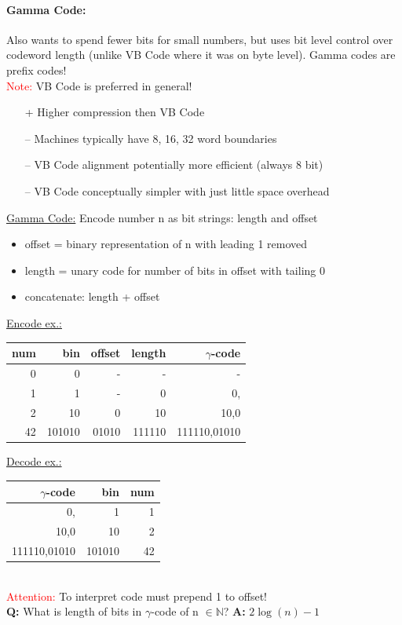 \documentclass[a4paper,11pt]{article}
\newcommand{\N}{\mathbb{N}}
\begin{document}
\begin{multicols}{2}
\paragraph{Gamma Code:} Also wants to spend fewer bits for small numbers, but uses bit level control over codeword length (unlike VB Code where it was on byte level). Gamma codes are prefix codes!\\
\textcolor{red}{Note:} VB Code is preferred in general!
\begin{itemize}
  \item[+] Higher compression then VB Code
  \item[--] Machines typically have 8, 16, 32 word boundaries
  \item[--] VB Code alignment potentially more efficient (always 8 bit)
  \item[--] VB Code conceptually simpler with just little space overhead
\end{itemize}
\vspace{0.2cm}
\begin{addmargin}[0.28cm]{0cm} %
  \underline{Gamma Code:} Encode number n as bit strings: length and offset
  \begin{itemize}
    \item offset = binary representation of n with leading 1 removed
    \item length = unary code for number of bits in offset with tailing 0
    \item concatenate: length + offset
  \end{itemize}
  \underline{Encode ex.:}\\
  \vspace{-0.3cm}
  \begin{flushright}
    \begin{tabular}{r|r|r|r|r}
      num & bin & offset & length & $\gamma$-code \\
      \hline
      0 & 0 & - & - & - \\
      1 & 1 & - & 0 & 0, \\
      2 & 10 & 0 & 10 & 10,0\\
      42 & 101010 & 01010 & 111110 & 111110,01010\\
    \end{tabular}
  \end{flushright}
  \underline{Decode ex.:}\\
  \vspace{-0.3cm}
  \hspace{2cm}
    \begin{tabular}{r|r|r}
      $\gamma$-code & bin & num\\
      \hline
      0, & 1 & 1 \\
      10,0 & 10 & 2\\
      111110,01010 & 101010 & 42
    \end{tabular}    \\
    \textcolor{red}{Attention:} To interpret code must prepend 1 to offset!\\
  \textbf{Q:} What is length of bits in $\gamma$-code of n $\in \N$? \textbf{A:} $2 \log(n) - 1$ 
\end{addmargin}


\end{multicols}
\end{document}
